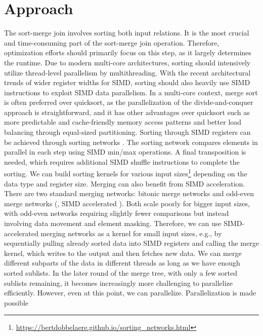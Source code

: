 \section{Approach}
\label{sec:approach}


The sort-merge join involves sorting both input relations. It is the most crucial and 
time-consuming part of the sort-merge join operation. Therefore, optimization efforts should
primarily focus on this step, as it largely determines the runtime. Due to modern multi-core 
architectures, sorting should intensively utilize thread-level parallelism by multithreading.
With the recent architectural trends of wider register widths for SIMD, sorting should also
heavily use SIMD instructions to exploit SIMD data parallelism. In a multi-core context, merge
sort is often preferred over quicksort, as the parallelization of the divide-and-conquer approach
is straightforward, and it has other advantages over quicksort such as more predictable and 
cache-friendly memory access patterns and better load balancing through equal-sized partitioning. 
Sorting through SIMD registers can be achieved through sorting networks \cite{10.1145/1468075.1468121}.
The sorting network compares elements in parallel in each step using SIMD min/max operations. 
A final transposition is needed, which requires additional SIMD shuffle instructions to complete
the sorting. We can build
sorting kernels for various input sizes\footnote{\url{https://bertdobbelaere.github.io/sorting_networks.html}} depending on the data type and register size. Merging can
also benefit from SIMD acceleration. There are two standard merging networks: bitonic merge networks
and odd-even merge networks (\cite{10.1145/1468075.1468121}, SIMD accelerated \cite{4336211}). Both scale poorly for bigger input sizes, with odd-even networks 
requiring slightly fewer comparisons but instead involving data movement and element masking.
Therefore, we can use SIMD-accelerated merging networks as a kernel for small input sizes, e.g., by
sequentially pulling already sorted data into SIMD registers and calling the merge kernel, which 
writes to the output and then fetches new data. We can merge different subparts of the data in
different threads as long as we have enough sorted sublists. In the later round of the merge tree,
with only a few sorted sublists remaining, it becomes increasingly more challenging to parallelize
efficiently. However, even at this point, we can parallelize. Parallelization is made possible 
